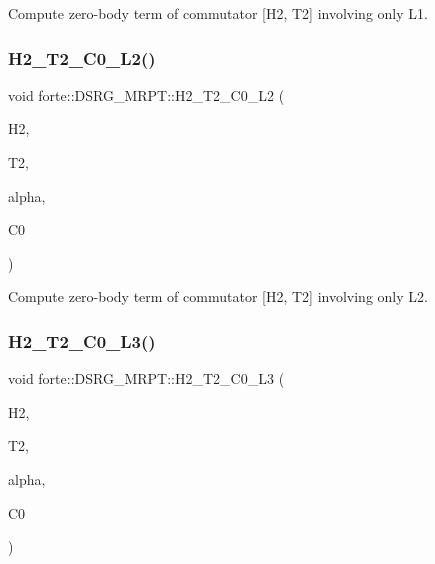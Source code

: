 Compute zero-\/body term of commutator \mbox{[}H2, T2\mbox{]} involving only L1. 

\mbox{\label{classforte_1_1_d_s_r_g___m_r_p_t_aba08dd12fb004053d65e40340a43d68e}} 
\subsubsection{\texorpdfstring{H2\+\_\+\+T2\+\_\+\+C0\+\_\+\+L2()}{H2\_T2\_C0\_L2()}}
{\footnotesize\ttfamily void forte\+::\+D\+S\+R\+G\+\_\+\+M\+R\+P\+T\+::\+H2\+\_\+\+T2\+\_\+\+C0\+\_\+\+L2 (\begin{DoxyParamCaption}\item[{Blocked\+Tensor \&}]{H2,  }\item[{Blocked\+Tensor \&}]{T2,  }\item[{const double \&}]{alpha,  }\item[{double \&}]{C0 }\end{DoxyParamCaption})\hspace{0.3cm}{\ttfamily [protected]}}



Compute zero-\/body term of commutator \mbox{[}H2, T2\mbox{]} involving only L2. 

\mbox{\label{classforte_1_1_d_s_r_g___m_r_p_t_afff5d8a261acd90a0486add4d7baff87}} 
\subsubsection{\texorpdfstring{H2\+\_\+\+T2\+\_\+\+C0\+\_\+\+L3()}{H2\_T2\_C0\_L3()}}
{\footnotesize\ttfamily void forte\+::\+D\+S\+R\+G\+\_\+\+M\+R\+P\+T\+::\+H2\+\_\+\+T2\+\_\+\+C0\+\_\+\+L3 (\begin{DoxyParamCaption}\item[{Blocked\+Tensor \&}]{H2,  }\item[{Blocked\+Tensor \&}]{T2,  }\item[{const double \&}]{alpha,  }\item[{double \&}]{C0 }\end{DoxyParamCaption})\hspace{0.3cm}{\ttfamily [protected]}}



